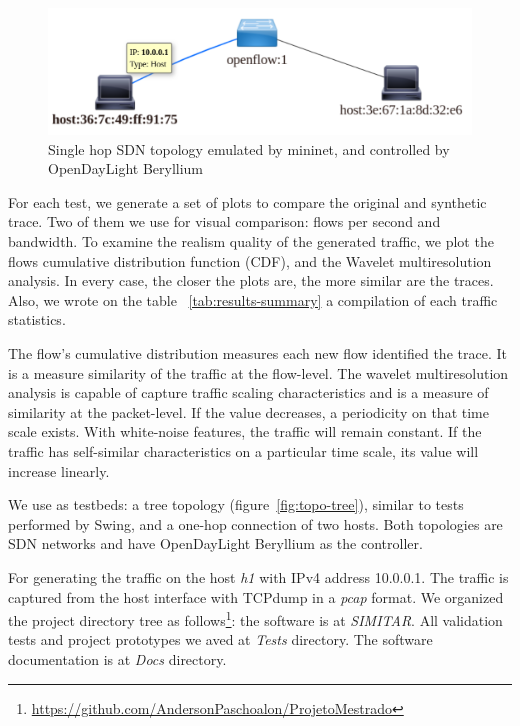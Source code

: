 \begin{figure}[!ht]
    \centering
    \includegraphics[scale=0.4]{figures/ch5/topo-simple}
    \caption{Single hop SDN topology emulated by mininet, and controlled by OpenDayLight Beryllium}
    \label{fig:topo-simple}
\end{figure}


For each test, we generate a set of plots to compare the original and synthetic trace. Two of them we use for visual comparison: flows per second and bandwidth. To examine the realism quality of the generated traffic, we plot the flows cumulative distribution function (CDF)\cite{harpoon-paper}, and the Wavelet multiresolution analysis.  In every case, the closer the plots are, the more similar are the traces. Also, we wrote on the table ~\ref{tab:results-summary} a compilation of each traffic statistics. 

The flow's cumulative distribution measures each new flow identified the trace. It is a measure similarity of the traffic at the flow-level.  The wavelet multiresolution analysis is capable of capture traffic scaling characteristics and is a measure of similarity at the packet-level. If the value decreases, a periodicity on that time scale exists. With white-noise features, the traffic will remain constant. If the traffic has self-similar characteristics on a particular time scale, its value will increase linearly.

We use as testbeds: a tree topology (figure~\ref{fig:topo-tree}), similar to tests performed by Swing\cite{swing-paper}\cite{background-traffic-matter}\cite{legotg-paper}, and a one-hop connection of two hosts. Both topologies are SDN networks and have OpenDayLight Beryllium as the controller.

For generating the traffic on the host \textit{h1} with IPv4 address 10.0.0.1. The traffic is captured from the host interface with TCPdump in a \textit{pcap} format.  We organized the project directory tree as follows\footnote{ \href{https://github.com/AndersonPaschoalon/ProjetoMestrado}{https://github.com/AndersonPaschoalon/ProjetoMestrado} }: the software is at \textit{SIMITAR}. All validation tests and project prototypes we aved at \textit{Tests} directory. The software documentation is at \textit{Docs} directory.

